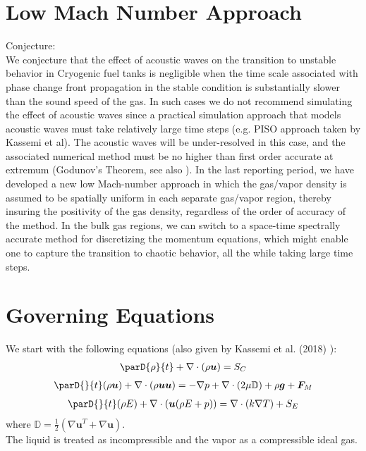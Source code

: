 \documentclass[]{article}
\begin{document}
\section*{Low Mach Number Approach} 
Conjecture:\\
		
We conjecture that the effect of acoustic waves 
on the transition to unstable
behavior in Cryogenic fuel 
tanks is negligible when the time scale associated with 
phase change front propagation in the stable
condition 
is substantially slower than the sound speed of the gas.
In such cases we do not recommend simulating the
effect of acoustic waves
since a practical simulation approach that models
acoustic waves must take relatively large time steps
(e.g. PISO approach taken by Kassemi et al\cite{KASSEMI2018}).  
The acoustic waves
will be under-resolved in this case, and the associated numerical 
method must be
no higher than first order accurate at extremum 
(Godunov's Theorem, see also \cite{Harten1987}).
In the last reporting period,
we have developed a new low Mach-number approach in which
the gas/vapor density is assumed to be 
spatially uniform in each separate gas/vapor region,
thereby insuring the positivity of the gas
density, regardless of the order of accuracy of the
method.  In the bulk gas regions, we can switch to a space-time
spectrally accurate method for discretizing the momentum 
equations\cite{Pei2019}, which might enable one to
capture the transition to chaotic behavior, all the while taking large
time steps.  \\
		
\section*{Governing Equations} 
We start with the following equations 
(also given by Kassemi et al. (2018) \cite{KASSEMI2018}):
\begin{eqnarray*}
\parD{\rho}{t} + \nabla\cdot(\rho\bm{u}) = S_C
\end{eqnarray*}
\begin{eqnarray*}
\parD{}{t}(\rho\bm{u}) + \nabla\cdot(\rho \bm{u}\bm{u}) = 
 -\nabla p +\nabla\cdot(2\mu \mathbb{D}) + \rho\bm{g} + \bm{F}_M
\end{eqnarray*}
\begin{eqnarray*}
\parD{}{t}(\rho E) + \nabla\cdot(\bm{u}(\rho E + p)) = 
\nabla\cdot(k\nabla T)+S_E
\end{eqnarray*}
where $\mathbb{D} = \frac{1}{2}(\nabla\bm{u}^T + \nabla\bm{u})$.\\
The liquid is treated as incompressible and the vapor as a 
compressible ideal gas.
		
\end{document}
